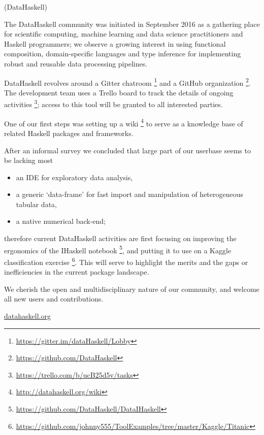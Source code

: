 \documentclass[DIV16,twocolumn,10pt]{scrreprt}
\begin{document}
\begin{hcarentry}{(DataHaskell)}
\makeheader

The DataHaskell community was initiated in September 2016 as a gathering place for scientific computing, machine learning and data science practitioners and Haskell programmers; we observe a growing interest in using functional composition, domain-specific languages and type inference for implementing robust and reusable data processing pipelines.


DataHaskell revolves around a Gitter chatroom \footnote{\url{https://gitter.im/dataHaskell/Lobby}} and a GitHub organization \footnote{\url{https://github.com/DataHaskell}}. The development team uses a Trello board to track the details of ongoing activities \footnote{\url{https://trello.com/b/ucB25d5v/tasks}}; access to this tool will be granted to all interested parties.

One of our first steps was setting up a wiki \footnote{\url{http://datahaskell.org/wiki}} to serve as a knowledge base of related Haskell packages and frameworks.

After an informal survey we concluded that large part of our userbase seems to be lacking most
\begin{itemize} 
\item an IDE for exploratory data analysis,
\item a generic `data-frame' for fast import and manipulation of heterogeneous tabular data,
\item a native numerical back-end;
\end{itemize}
therefore current DataHaskell activities are first focusing on improving the ergonomics of the IHaskell notebook \footnote{\url{https://github.com/DataHaskell/DataIHaskell}}, and putting it to use on a Kaggle classification exercise \footnote{\url{https://github.com/johnny555/ToolExamples/tree/master/Kaggle/Titanic}}. This will serve to highlight the merits and the gaps or inefficiencies in the current package landscape.

We cherish the open and multidisciplinary nature of our community, and welcome all new users and contributions.

\FurtherReading
  \url{datahaskell.org}
\end{hcarentry}
\end{document}
